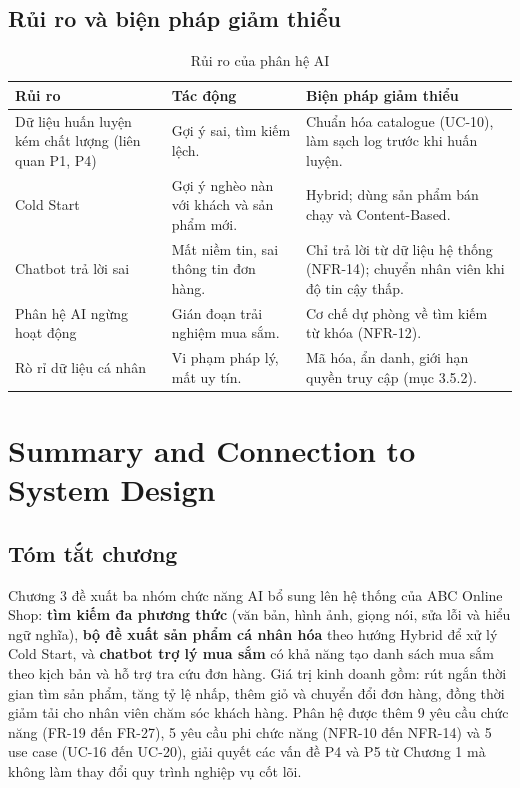 \documentclass[12pt,a4paper,oneside]{report}
\begin{document}
\subsection{Rủi ro và biện pháp giảm thiểu}

\begin{longtable}{p{4.4cm}p{5.8cm}p{5.8cm}}
\caption{Rủi ro của phân hệ AI}\\
\toprule
\textbf{Rủi ro} & \textbf{Tác động} & \textbf{Biện pháp giảm thiểu} \\
\midrule
\endhead
\bottomrule
\endlastfoot
Dữ liệu huấn luyện kém chất lượng (liên quan P1, P4) & Gợi ý sai, tìm kiếm lệch. & Chuẩn hóa catalogue (UC-10), làm sạch log trước khi huấn luyện. \\
Cold Start & Gợi ý nghèo nàn với khách và sản phẩm mới. & Hybrid; dùng sản phẩm bán chạy và Content-Based. \\
Chatbot trả lời sai & Mất niềm tin, sai thông tin đơn hàng. & Chỉ trả lời từ dữ liệu hệ thống (NFR-14); chuyển nhân viên khi độ tin cậy thấp. \\
Phân hệ AI ngừng hoạt động & Gián đoạn trải nghiệm mua sắm. & Cơ chế dự phòng về tìm kiếm từ khóa (NFR-12). \\
Rò rỉ dữ liệu cá nhân & Vi phạm pháp lý, mất uy tín. & Mã hóa, ẩn danh, giới hạn quyền truy cập (mục 3.5.2). \\
\end{longtable}

\section{Summary and Connection to System Design}

\subsection{Tóm tắt chương}

Chương 3 đề xuất ba nhóm chức năng AI bổ sung lên hệ thống của ABC Online Shop: \textbf{tìm kiếm đa phương thức} (văn bản, hình ảnh, giọng nói, sửa lỗi và hiểu ngữ nghĩa), \textbf{bộ đề xuất sản phẩm cá nhân hóa} theo hướng Hybrid để xử lý Cold Start, và \textbf{chatbot trợ lý mua sắm} có khả năng tạo danh sách mua sắm theo kịch bản và hỗ trợ tra cứu đơn hàng. Giá trị kinh doanh gồm: rút ngắn thời gian tìm sản phẩm, tăng tỷ lệ nhấp, thêm giỏ và chuyển đổi đơn hàng, đồng thời giảm tải cho nhân viên chăm sóc khách hàng. Phân hệ được thêm 9 yêu cầu chức năng (FR-19 đến FR-27), 5 yêu cầu phi chức năng (NFR-10 đến NFR-14) và 5 use case (UC-16 đến UC-20), giải quyết các vấn đề P4 và P5 từ Chương 1 mà không làm thay đổi quy trình nghiệp vụ cốt lõi.
\end{document}
